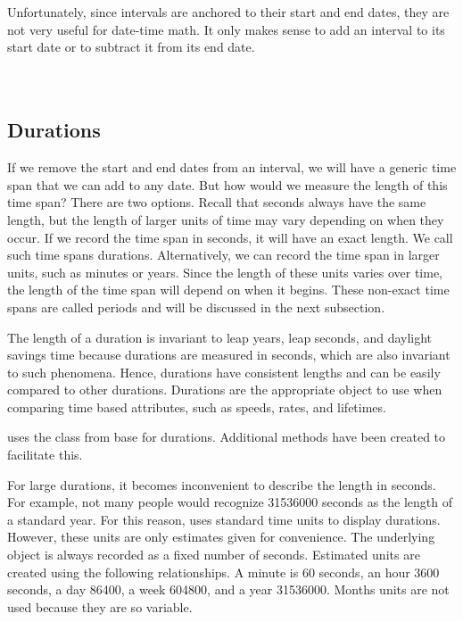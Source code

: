 \documentclass[article]{jss}
\begin{document}
Unfortunately, since intervals are anchored to their start and end dates, they are not very useful for date-time math. It only makes sense to add an interval to its start date or to subtract it from its end date.\\

\\
\\


\subsection{Durations}
\label{sec:durations}

If we remove the start and end dates from an interval, we will have a generic time span that we can add to any date. But how would we measure the length of this time span? There are two options. Recall that seconds always have the same length, but the length of larger units of time may vary depending on when they occur. If we record the time span in seconds, it will have an exact length. We call such time spans durations. Alternatively, we can record the time span in larger units, such as minutes or years. Since the length of these units varies over time, the length of the time span will depend on when it begins. These non-exact time spans are called periods and will be discussed in the next subsection.

The length of a duration is invariant to leap years, leap seconds, and daylight savings time because durations are measured in seconds, which are also invariant to such phenomena. Hence, durations have consistent lengths and can be easily compared to other durations. Durations are the appropriate object to use when comparing time based attributes, such as speeds, rates, and lifetimes.

 uses the  class from base  for durations. Additional  methods have been created to facilitate this. 

For large durations, it becomes inconvenient to describe the length in seconds. For example, not many people would recognize 31536000 seconds as the length of a standard year. For this reason,  uses standard time units to display durations. However, these units are only estimates given for convenience. The underlying object is always recorded as a fixed number of seconds. Estimated units are created using the following relationships. A minute is 60 seconds, an hour 3600 seconds, a day 86400, a week 604800, and a year 31536000. Months units are not used because they are so variable.
\end{document}
